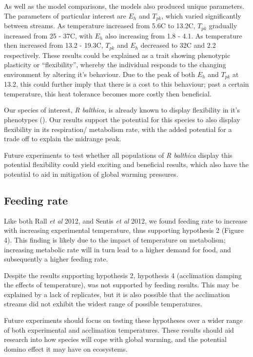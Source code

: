 \documentclass[../../Paper.tex]{subfiles}
\begin{document}
As well as the model comparisons, the models also produced unique parameters. The parameters of particular
interest are $E_h$ and $T_{pk}$, which varied significantly between streams. As temperature increased
from 5.6\degree C to 13.2\degree C, $T_{pk}$ gradually increased from 25 - 37\degree C, with $E_h$ also increasing
from 1.8 - 4.1. As temperature then increased from 13.2 - 19.3\degree C, $T_{pk}$ and $E_h$ decreased to 32\degree C
and 2.2 respectively. These results could be explained as a trait showing phenotypic plasticity or ``flexibility'',
whereby the individual responds to the changing environment by altering it's behaviour. Due to the peak of both $E_h$
and $T_{pk}$ at 13.2, this could further imply that there is a cost to this behaviour; past a certain 
temperature, this heat tolerance becomes more costly then beneficial.

Our species of interest, \textit{R balthica}, is already known to display flexibility in it's 
phenotypes (\cite{ahlgren_camouflaged_2013}). Our results support the potential for this species
to also display flexibility in its respiration/ metabolism rate, with the added potential for a trade 
off to explain the midrange peak. 

Future experiments to test whether all populations of \textit{R balthica} display this potential flexibility
could yield exciting and beneficial results, which also have the potential to aid in mitigation of global warming
pressures. 

\subsection*{Feeding rate}

Like both Rall \textit{et al} 2012, and Sentis \textit{et al} 2012, we found feeding rate to increase with
increasing experimental temperature, thus supporting hypothesis 2 (Figure 4). This finding is likely due to the
impact of temperature on metabolism; increasing metabolic rate will in turn lead to a higher demand for food, and 
subsequently a higher feeding rate. 

Despite the results supporting hypothesis 2, hypothesis 4 (acclimation damping the effects of temperature), was not 
supported by feeding results. This may be explained by a lack of replicates, but it is also possible that the
acclimation streams did not exhibit the widest range of possible temperatures. 

Future experiments should focus on testing these hypotheses over a wider range of both experimental and acclimation 
temperatures. These results should aid research into how species will cope with global warming, and the 
potential domino effect it may have on ecosystems. 
\end{document}
